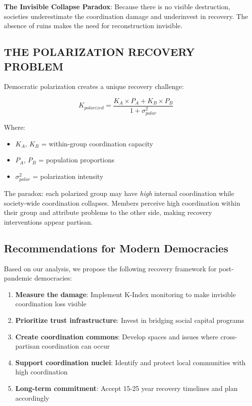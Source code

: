 \documentclass[11pt,letterpaper]{article}
\newcommand{\kindex}{K}
\begin{document}
\textbf{The Invisible Collapse Paradox}: Because there is no visible destruction, societies underestimate the coordination damage and underinvest in recovery. The absence of ruins makes the need for reconstruction invisible.

\subsection{THE POLARIZATION RECOVERY PROBLEM}

Democratic polarization creates a unique recovery challenge:

\begin{equation}
\kindex_{polarized} = \frac{\kindex_A \times P_A + \kindex_B \times P_B}{1 + \sigma_{polar}^2}
\label{eq:polarization}
\end{equation}

Where:
\begin{itemize}
\item $\kindex_A$, $\kindex_B$ = within-group coordination capacity
\item $P_A$, $P_B$ = population proportions
\item $\sigma_{polar}^2$ = polarization intensity
\end{itemize}

The paradox: each polarized group may have \emph{high} internal coordination while society-wide coordination collapses. Members perceive high coordination within their group and attribute problems to the other side, making recovery interventions appear partisan.

\subsection{Recommendations for Modern Democracies}

Based on our analysis, we propose the following recovery framework for post-pandemic democracies:

\begin{enumerate}
\item \textbf{Measure the damage}: Implement K-Index monitoring to make invisible coordination loss visible
\item \textbf{Prioritize trust infrastructure}: Invest in bridging social capital programs
\item \textbf{Create coordination commons}: Develop spaces and issues where cross-partisan coordination can occur
\item \textbf{Support coordination nuclei}: Identify and protect local communities with high coordination
\item \textbf{Long-term commitment}: Accept 15-25 year recovery timelines and plan accordingly
\end{enumerate}
\end{document}
